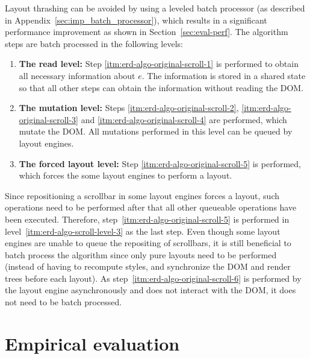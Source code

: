 \documentclass{llncs}
\begin{document}
  \noindent
  Layout thrashing can be avoided by using a leveled batch processor (as described in Appendix~\ref{sec:imp_batch_processor}), which results in a significant performance improvement as shown in Section~\ref{sec:eval-perf}.
  The algorithm steps are batch processed in the following levels:
  \begin{enumerate}
    \item\label{itm:erd-algo-scroll-level-1}
      \textbf{The read level:}
      Step \ref{itm:erd-algo-original-scroll-1} is performed to obtain all necessary information about $e$.
      The information is stored in a shared state so that all other steps can obtain the information without reading the DOM.
    \item\label{itm:erd-algo-scroll-level-2}
      \textbf{The mutation level:}
      Steps \ref{itm:erd-algo-original-scroll-2}, \ref{itm:erd-algo-original-scroll-3} and \ref{itm:erd-algo-original-scroll-4} are performed, which mutate the DOM.
      All mutations performed in this level can be queued by layout engines.
    \item\label{itm:erd-algo-scroll-level-3}
      \textbf{The forced layout level:}
      Step \ref{itm:erd-algo-original-scroll-5} is performed, which forces the some layout engines to perform a layout.
  \end{enumerate}

  \noindent
  Since repositioning a scrollbar in some layout engines forces a layout, such operations need to be performed after that all other queueable operations have been executed.
  Therefore, step~\ref{itm:erd-algo-original-scroll-5} is performed in level~\ref{itm:erd-algo-scroll-level-3} as the last step.
  Even though some layout engines are unable to queue the repositing of scrollbars, it is still beneficial to batch process the algorithm since only pure layouts need to be performed (instead of having to recompute styles, and synchronize the DOM and render trees before each layout).
  As step~\ref{itm:erd-algo-original-scroll-6} is performed by the layout engine asynchronously and does not interact with the DOM, it does not need to be batch processed.


\section{Empirical evaluation}\label{sec:eval}
\end{document}
